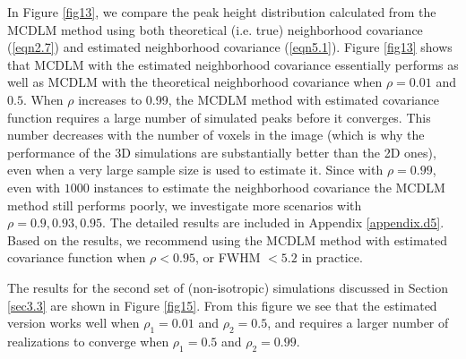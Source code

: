 \documentclass{article}
\begin{document}
In Figure \ref{fig13}, we compare the peak height distribution calculated from the MCDLM method using both theoretical (i.e. true) neighborhood covariance (\ref{eqn2.7}) and estimated neighborhood covariance (\ref{eqn5.1}). Figure \ref{fig13} shows that MCDLM with the estimated neighborhood covariance essentially performs as well as MCDLM with the theoretical neighborhood covariance when $\rho = 0.01$ and $0.5$. When $\rho$ increases to 0.99, the MCDLM method with estimated covariance function requires a large number of simulated peaks before it converges. This number decreases with the number of voxels in the image (which is why the performance of the 3D simulations are substantially better than the 2D ones), even when a very large sample size is used to estimate it. Since with $\rho = 0.99$, even with $1000$ instances to estimate the neighborhood covariance the MCDLM method still performs poorly, we investigate more scenarios with $\rho = 0.9, 0.93, 0.95$. The detailed results are included in Appendix \ref{appendix.d5}. Based on the results, we recommend using the MCDLM method with estimated covariance function when $\rho < 0.95$, or FWHM $< 5.2$ in practice.

The results for the second set of (non-isotropic) simulations discussed in Section \ref{sec3.3} are shown in Figure \ref{fig15}. From this figure we see that the estimated version works well when $\rho_1 = 0.01$ and $\rho_2 = 0.5$, and requires a larger number of realizations to converge when $\rho_1 = 0.5$ and $\rho_2 = 0.99$.
\end{document}

